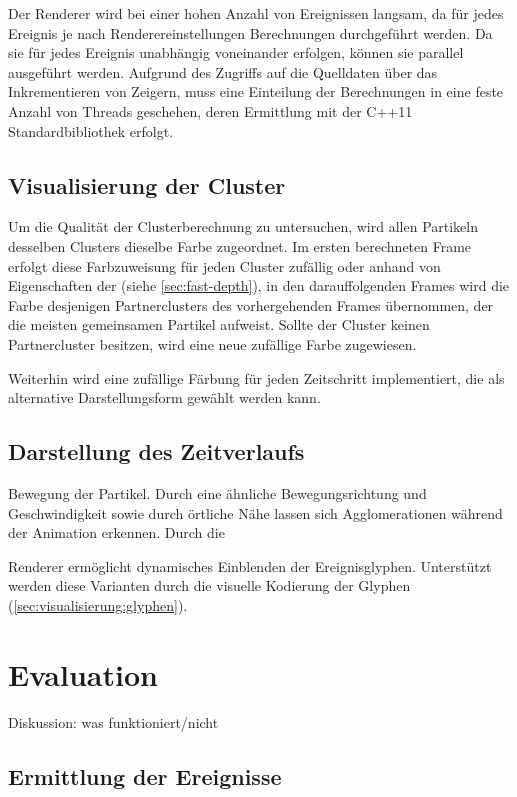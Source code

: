 Der Renderer wird bei einer hohen Anzahl von Ereignissen langsam, da für jedes Ereignis je nach Renderereinstellungen Berechnungen durchgeführt werden. Da sie für jedes Ereignis unabhängig voneinander erfolgen, können sie parallel ausgeführt werden. Aufgrund des Zugriffs auf die Quelldaten über das Inkrementieren von Zeigern, muss eine Einteilung der Berechnungen in eine feste Anzahl von Threads geschehen, deren Ermittlung mit der C++11 Standardbibliothek  erfolgt. 

\section{Visualisierung der Cluster}\label{sec:visualisierung:cluster}

Um die Qualität der Clusterberechnung zu untersuchen, wird allen Partikeln desselben Clusters dieselbe Farbe zugeordnet. Im ersten berechneten Frame erfolgt diese Farbzuweisung für jeden Cluster zufällig oder anhand von Eigenschaften der  (siehe \autoref{sec:fast-depth}), in den darauffolgenden Frames wird die Farbe desjenigen Partnerclusters des vorhergehenden Frames übernommen, der die meisten gemeinsamen Partikel aufweist. Sollte der Cluster keinen Partnercluster besitzen, wird eine neue zufällige Farbe zugewiesen.

Weiterhin wird eine zufällige Färbung für jeden Zeitschritt implementiert, die als alternative Darstellungsform gewählt werden kann.

\section{Darstellung des Zeitverlaufs}

Bewegung der Partikel. Durch eine ähnliche Bewegungsrichtung und Geschwindigkeit sowie durch örtliche Nähe lassen sich Agglomerationen während der Animation erkennen. Durch die 

Renderer ermöglicht dynamisches Einblenden der Ereignisglyphen. Unterstützt werden diese Varianten durch die visuelle Kodierung der Glyphen (\autoref{sec:visualisierung:glyphen}).

\chapter{Evaluation}

Diskussion: was funktioniert/nicht

\section{Ermittlung der Ereignisse}\label{sec:eva:ereignisse}

